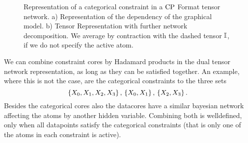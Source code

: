 \begin{figure}[h]
\begin{center}
	
\end{center}
\caption{Representation of a categorical constraint in a $\mathrm{CP}$ Format tensor network.
	a) Representation of the dependency of the graphical model.
	b) Tensor Representation with further network decomposition.
	We average by contraction with the dashed tensor $\mathbb{I}$, if we do not specify the active atom.
	}
\label{fig:CategoricalDecomposition}
\end{figure}

\begin{remark}
	We can combine constraint cores by Hadamard products in the dual tensor network representation, as long as they can be satisfied together.
	An example, where this is not the case, are the categorical constraints to the three sets
		\[ \{X_{0},X_{1},X_{2},X_{3}\} \, , \, \{X_{0},X_{1}\}\, ,\,\{X_{2},X_{3}\} \, . \]
	Besides the categorical cores also the datacores have a similar bayesian network affecting the atoms by another hidden variable.
	Combining both is welldefined, only when all datapoints satisfy the categorical constraints (that is only one of the atoms in each constraint is active).
\end{remark}


